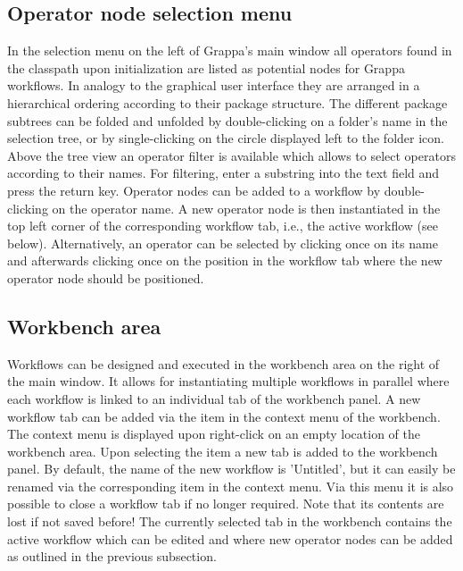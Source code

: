 \subsection{Operator node selection menu} 
In the selection menu on the left of Grappa's main window all \alida operators found in the 
classpath upon initialization are listed as potential nodes for Grappa workflows. 
In analogy to the graphical user interface
they are arranged in a hierarchical ordering 
according to their package structure. The different package subtrees can be
folded and unfolded by double-clicking on a folder's name in the selection tree,
or by single-clicking on the circle displayed left to the folder icon. Above the
tree view an operator filter is available which allows to select operators
according to their names. For filtering, enter a substring into the text
field and press the return key. 
Operator nodes can be added to a workflow by double-clicking on the operator
name. A new operator node is then instantiated in the top left corner of the
corresponding workflow tab, i.e., the active workflow (see below).
Alternatively, an operator can be selected by clicking once on its name 
and afterwards clicking once on the position in the workflow tab where the new
operator node should be positioned.
 
\subsection{Workbench area} 
Workflows can be designed and executed in the workbench area on the right of the main window. It allows for instantiating
multiple workflows in parallel where each workflow is linked to an individual tab of the workbench panel. 
A new workflow tab can be added via the item  in the context menu of the workbench. 
The context menu is displayed upon right-click on an empty location of the workbench area. 
Upon selecting the item  a new tab is added to the workbench panel.
By default, the name of the new workflow is 'Untitled', but it can easily be
renamed via the corresponding item  in the context menu. Via this
menu it is also possible to close a workflow tab if no longer required. Note
that its contents are lost if not saved before! The currently selected tab in
the workbench contains the active workflow which can be edited and where
new operator nodes can be added as outlined in the previous subsection.

